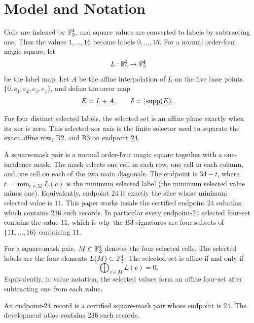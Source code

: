 \section{Model and Notation}

Cells are indexed by \(\mathbb F_2^4\), and square values are converted to labels by
subtracting one.  Thus the values \(1,\ldots,16\) become labels
\(0,\ldots,15\).  For a normal order-four magic square, let
\[
  L:\mathbb F_2^4\to\mathbb F_2^4
\]
be the label map.  Let \(A\) be the affine interpolation of \(L\) on the five
base points \(\{0,e_1,e_2,e_3,e_4\}\), and define the error map
\[
  E=L+A,\qquad \delta=|\operatorname{supp}(E)|.
\]

For four distinct selected labels, the selected set is an affine plane exactly
when its xor is zero.  This selected-xor axis is the finite selector used to
separate the exact affine row, B2, and B3 on endpoint \(24\).

\begin{definition}
A square-mask pair is a normal order-four magic square together with a
one-incidence mask.  The mask selects one cell in each row, one cell in each
column, and one cell on each of the two main diagonals.  The endpoint is
\(34-t\), where \(t=\min_{c\in M} L(c)\) is the minimum selected label (the
minimum selected value minus one).  Equivalently, endpoint \(24\) is exactly
the slice whose minimum selected value is \(11\).  This paper works inside the
certified endpoint \(24\) subatlas, which contains \(236\) such records.  In
particular every endpoint-\(24\) selected four-set contains the value \(11\),
which is why the B3 signatures are four-subsets of \(\{11,\ldots,16\}\)
containing \(11\).
\end{definition}

\begin{definition}
For a square-mask pair, \(M\subset \mathbb F_2^4\) denotes the four selected cells.
The selected labels are the four elements \(L(M)\subset \mathbb F_2^4\).  The selected
set is affine if and only if
\[
  \bigoplus_{c\in M}L(c)=0.
\]
Equivalently, in value notation, the selected values form an affine four-set
after subtracting one from each value.
\end{definition}

\begin{definition}
An endpoint-24 record is a certified square-mask pair whose endpoint is \(24\).
The development atlas contains \(236\) such records.
\end{definition}


